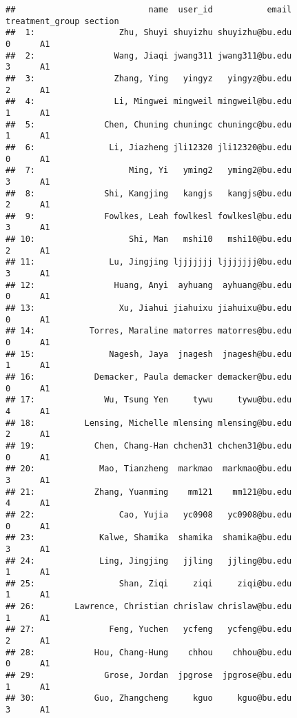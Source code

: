 \documentclass[
]{article}
\begin{document}
\begin{verbatim}
##                           name  user_id           email treatment_group section
##  1:                 Zhu, Shuyi shuyizhu shuyizhu@bu.edu               0      A1
##  2:                Wang, Jiaqi jwang311 jwang311@bu.edu               3      A1
##  3:                Zhang, Ying   yingyz   yingyz@bu.edu               2      A1
##  4:                Li, Mingwei mingweil mingweil@bu.edu               1      A1
##  5:              Chen, Chuning chuningc chuningc@bu.edu               1      A1
##  6:               Li, Jiazheng jli12320 jli12320@bu.edu               0      A1
##  7:                   Ming, Yi   yming2   yming2@bu.edu               3      A1
##  8:              Shi, Kangjing   kangjs   kangjs@bu.edu               2      A1
##  9:              Fowlkes, Leah fowlkesl fowlkesl@bu.edu               3      A1
## 10:                   Shi, Man   mshi10   mshi10@bu.edu               2      A1
## 11:               Lu, Jingjing ljjjjjjj ljjjjjjj@bu.edu               3      A1
## 12:                Huang, Anyi  ayhuang  ayhuang@bu.edu               0      A1
## 13:                 Xu, Jiahui jiahuixu jiahuixu@bu.edu               0      A1
## 14:           Torres, Maraline matorres matorres@bu.edu               0      A1
## 15:               Nagesh, Jaya  jnagesh  jnagesh@bu.edu               1      A1
## 16:            Demacker, Paula demacker demacker@bu.edu               0      A1
## 17:              Wu, Tsung Yen     tywu     tywu@bu.edu               4      A1
## 18:          Lensing, Michelle mlensing mlensing@bu.edu               2      A1
## 19:            Chen, Chang-Han chchen31 chchen31@bu.edu               0      A1
## 20:             Mao, Tianzheng  markmao  markmao@bu.edu               3      A1
## 21:            Zhang, Yuanming    mm121    mm121@bu.edu               4      A1
## 22:                 Cao, Yujia   yc0908   yc0908@bu.edu               0      A1
## 23:             Kalwe, Shamika  shamika  shamika@bu.edu               3      A1
## 24:             Ling, Jingjing   jjling   jjling@bu.edu               1      A1
## 25:                 Shan, Ziqi     ziqi     ziqi@bu.edu               1      A1
## 26:        Lawrence, Christian chrislaw chrislaw@bu.edu               1      A1
## 27:               Feng, Yuchen   ycfeng   ycfeng@bu.edu               2      A1
## 28:            Hou, Chang-Hung    chhou    chhou@bu.edu               0      A1
## 29:              Grose, Jordan  jpgrose  jpgrose@bu.edu               1      A1
## 30:            Guo, Zhangcheng     kguo     kguo@bu.edu               3      A1

\end{verbatim}
\end{document}
